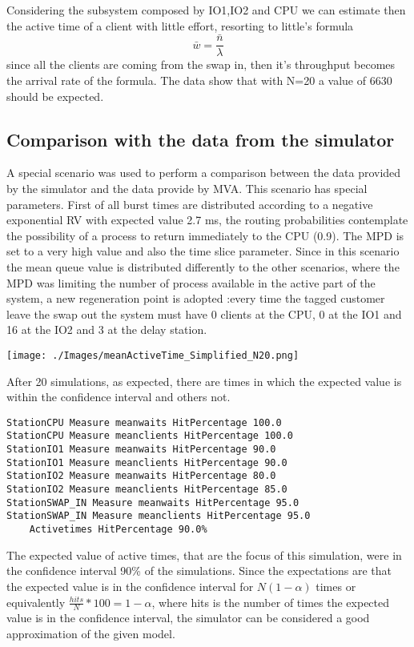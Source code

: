 \documentclass[12pt,a4paper]{article}
\begin{document}
Considering the subsystem composed by IO1,IO2 and CPU we can estimate then the active time of a client with little effort, resorting to little's formula
$$
    \bar{w}= \frac{\bar{n}}{\lambda}
$$
since all the clients are coming from the swap in, then it's throughput becomes the arrival rate of the formula. The data show that with N=20 a value of 6630 should be expected.

\subsection{Comparison with the data from the simulator}
A special scenario was used to perform a comparison between the data provided by the simulator and the data provide by MVA. This scenario has special parameters. First of all burst times are distributed according to a negative exponential RV with expected value 2.7 ms, the routing probabilities contemplate the possibility of a process to return immediately to the CPU (0.9). The MPD is set to a very high value and also the time slice parameter. Since in this scenario the mean queue value is distributed differently to the other scenarios, where the MPD was limiting the number of process available in the active part of the system, a new regeneration point is adopted :every time the tagged customer leave the swap out the system must have 0 clients at the CPU, 0 at the IO1 and 16 at the IO2 and 3 at the delay station.

\texttt{[image: ./Images/meanActiveTime\_Simplified\_N20.png]}



After 20 simulations, as expected, there are times in which the expected value is within the confidence interval and others not. 
\begin{verbatim}
StationCPU Measure meanwaits HitPercentage 100.0
StationCPU Measure meanclients HitPercentage 100.0
StationIO1 Measure meanwaits HitPercentage 90.0
StationIO1 Measure meanclients HitPercentage 90.0
StationIO2 Measure meanwaits HitPercentage 80.0
StationIO2 Measure meanclients HitPercentage 85.0
StationSWAP_IN Measure meanwaits HitPercentage 95.0
StationSWAP_IN Measure meanclients HitPercentage 95.0
    Activetimes HitPercentage 90.0%
\end{verbatim}

The expected value of active times, that are the focus of this simulation, were in the confidence interval 90\% of the simulations. Since the expectations are that the expected value is in the confidence interval for $N(1-\alpha)$ times or equivalently $\frac{hits}{N}*100=1-\alpha$, where hits is the number of times the expected value is in the confidence interval, the simulator can be considered a good approximation of the given model.
\end{document}
